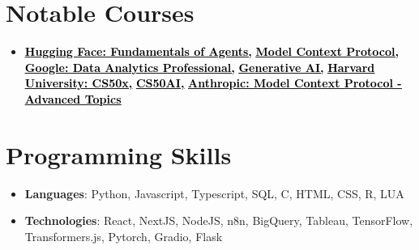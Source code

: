 \documentclass[letterpaper,10.8pt]{article}
\let\oldhref\href
\renewcommand{\href}[2]{\oldhref{#1}{\textcolor{linkgrey}{\uline{\textcolor{black}{#2}}}}}
\newcommand{\resumeSubHeadingListStart}{\begin{itemize}[leftmargin=*]}
\newcommand{\resumeSubHeadingListEnd}{\end{itemize}}
\begin{document}
\section*{Notable Courses}
\resumeSubHeadingListStart
  \item \textbf{\href{https://cdn-uploads.huggingface.co/production/uploads/noauth/iD2BAETFKpkiYBWPVz1fn.webp}{Hugging Face: Fundamentals of Agents,}} \textbf{\href{https://cdn-uploads.huggingface.co/production/uploads/noauth/WGIQW7LgmVhfRCtQc-uF7.webp}{Model Context Protocol,}} \textbf{\href{https://www.coursera.org/account/accomplishments/specialization/AS9JOBALFZSL}{Google: Data Analytics Professional,}} \textbf{\href{https://www.cloudskillsboost.google/public_profiles/988acd6f-a370-42ec-a4e7-9101d225dc4b/badges/10543975}{Generative AI,}}
  \textbf{\href{https://certificates.cs50.io/fe4b0a5a-c586-4a15-91ec-6b8a65f829e4.pdf?size=letter}{Harvard University: CS50x,}}
  \textbf{\href{https://certificates.cs50.io/025b42e2-4fe7-4095-a3d8-0f2ef49e7b1c.pdf?size=letter}{CS50AI,}}
  \textbf{\href{https://certificates.cs50.io/025b42e2-4fe7-4095-a3d8-0f2ef49e7b1c.pdf?size=letter}{Anthropic: Model Context Protocol - Advanced Topics}}
\resumeSubHeadingListEnd

\section*{Programming Skills}
\resumeSubHeadingListStart
  \item{
    \textbf{Languages}{: Python, Javascript, Typescript, SQL, C, HTML, CSS, R, LUA}
  }
  \item{
    \textbf{Technologies}{: React, NextJS, NodeJS, n8n, BigQuery, Tableau, TensorFlow, Transformers.js, Pytorch, Gradio, Flask}
  }
\resumeSubHeadingListEnd
\end{document}
